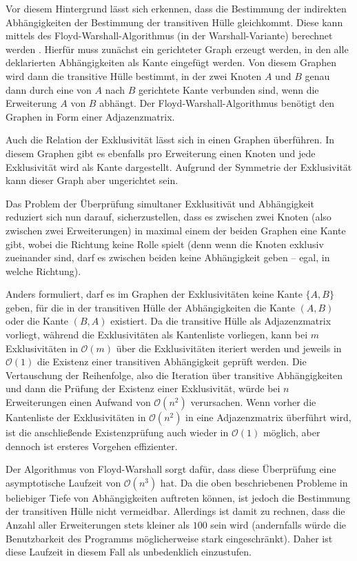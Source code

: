 Vor diesem Hintergrund lässt sich erkennen, dass die Bestimmung der indirekten Abhängigkeiten der Bestimmung der transitiven Hülle gleichkommt. Diese kann mittels des Floyd-Warshall-Algorithmus (in der Warshall-Variante) berechnet werden \cite{warshal1_algorithm}. Hierfür muss zunächst ein gerichteter Graph erzeugt werden, in den alle deklarierten Abhängigkeiten als Kante eingefügt werden. Von diesem Graphen wird dann die transitive Hülle bestimmt, in der zwei Knoten $A$ und $B$ genau dann durch eine von $A$ nach $B$ gerichtete Kante verbunden sind, wenn die Erweiterung $A$ von $B$ abhängt. Der Floyd-Warshall-Algorithmus benötigt den Graphen in Form einer Adjazenzmatrix.

Auch die Relation der Exklusivität lässt sich in einen Graphen überführen. In diesem Graphen gibt es ebenfalls pro Erweiterung einen Knoten und jede Exklusivität wird als Kante dargestellt. Aufgrund der Symmetrie der Exklusivität kann dieser Graph aber ungerichtet sein.

Das Problem der Überprüfung simultaner Exklusitivät und Abhängigkeit reduziert sich nun darauf, sicherzustellen, dass es zwischen zwei Knoten (also zwischen zwei Erweiterungen) in maximal einem der beiden Graphen eine Kante gibt, wobei die Richtung keine Rolle spielt (denn wenn die Knoten exklusiv zueinander sind, darf es zwischen beiden keine Abhängigkeit geben -- egal, in welche Richtung).

Anders formuliert, darf es im Graphen der Exklusivitäten keine Kante $\{A, B\}$ geben, für die in der transitiven Hülle der Abhängigkeiten die Kante $(A, B)$ oder die Kante $(B, A)$ existiert. Da die transitive Hülle als Adjazenzmatrix vorliegt, während die Exklusivitäten als Kantenliste vorliegen, kann bei $m$ Exklusivitäten in $\mathcal{O}(m)$ über die Exklusivitäten iteriert werden und jeweils in $\mathcal{O}(1)$ die Existenz einer transitiven Abhängigkeit geprüft werden. Die Vertauschung der Reihenfolge, also die Iteration über transitive Abhängigkeiten und dann die Prüfung der Existenz einer Exklusivität, würde bei $n$ Erweiterungen einen Aufwand von $\mathcal{O}(n^2)$ verursachen. Wenn vorher die Kantenliste der Exklusivitäten in $\mathcal{O}(n^2)$ in eine Adjazenzmatrix überführt wird, ist die anschließende Existenzprüfung auch wieder in $\mathcal{O}(1)$ möglich, aber dennoch ist ersteres Vorgehen effizienter.

Der Algorithmus von Floyd-Warshall sorgt dafür, dass diese Überprüfung eine asymptotische Laufzeit von $\mathcal{O}(n^3)$ hat. Da die oben beschriebenen Probleme in beliebiger Tiefe von Abhängigkeiten auftreten können, ist jedoch die Bestimmung der transitiven Hülle nicht vermeidbar. Allerdings ist damit zu rechnen, dass die Anzahl aller Erweiterungen stets kleiner als $100$ sein wird (andernfalls würde die Benutzbarkeit des Programms möglicherweise stark eingeschränkt). Daher ist diese Laufzeit in diesem Fall als unbedenklich einzustufen.

